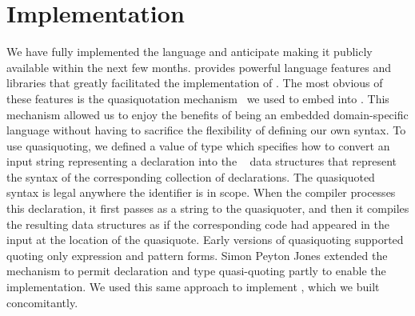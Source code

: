 \section{Implementation}
\label{sec:implementation}




We have fully implemented the \forest{} language and anticipate making
it publicly available within the next few months.
\haskell{} provides powerful language features and libraries that
greatly facilitated the implementation of \forest{}.  The most obvious
of these features is the quasiquotation mechanism~\cite{Mainland:quasi}
we used to embed \forest{} into \haskell{}.  This mechanism
allowed us to enjoy the benefits of being an embedded domain-specific
language without having to sacrifice the flexibility of
defining our own syntax. To use quasiquoting, we defined a \haskell{}
value  of type  which specifies how to
convert an input string representing a \forest{} declaration into the
\template{}~\cite{Sheard+:templatehaskell} 
data structures that represent the syntax of the
corresponding collection of \haskell{} declarations.
The quasiquoted syntax 
is legal anywhere the identifier  is in scope.
When the \haskell{} compiler processes this declaration, it first
passes  as a string to the  quasiquoter, and
then it compiles the resulting \template{} data structures as if the
corresponding \haskell{} code had appeared in the input at the
location of the quasiquote.  Early versions of quasiquoting
supported quoting only expression and pattern forms.  Simon Peyton
Jones extended the mechanism to permit declaration and type
quasi-quoting partly to enable the \forest{} implementation.  We used
this same approach to implement \padshaskell{}, which we built
concomitantly. 

